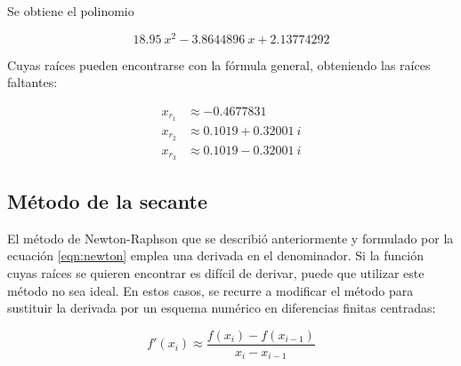 \begin{ex}
\begin{solution}
        Se obtiene el polinomio 

        \[
            18.95\ x^2 - 3.8644896\ x + 2.13774292
        \]
    
        Cuyas raíces pueden encontrarse con la fórmula general, obteniendo las
        raíces faltantes:

        \begin{align*}
            x_{r_1} & \approx -0.4677831 \\
            x_{r_2} & \approx 0.1019 + 0.32001\ i \\
            x_{r_3} & \approx 0.1019 - 0.32001\ i 
        \end{align*}
    \end{solution}

\end{ex}

\subsection{Método de la secante}

El método de Newton-Raphson que se describió anteriormente y formulado por la
ecuación \ref{eqn:newton} emplea una derivada en el denominador. Si la función
cuyas raíces se quieren encontrar es difícil de derivar, puede que utilizar este
método no sea ideal. En estos casos, se recurre a modificar el método para
sustituir la derivada por un esquema numérico en diferencias finitas centradas:

\[
    f'(x_i) \approx \frac{f(x_i) - f(x_{i-1})}{x_i - x_{i-1}}
\]
